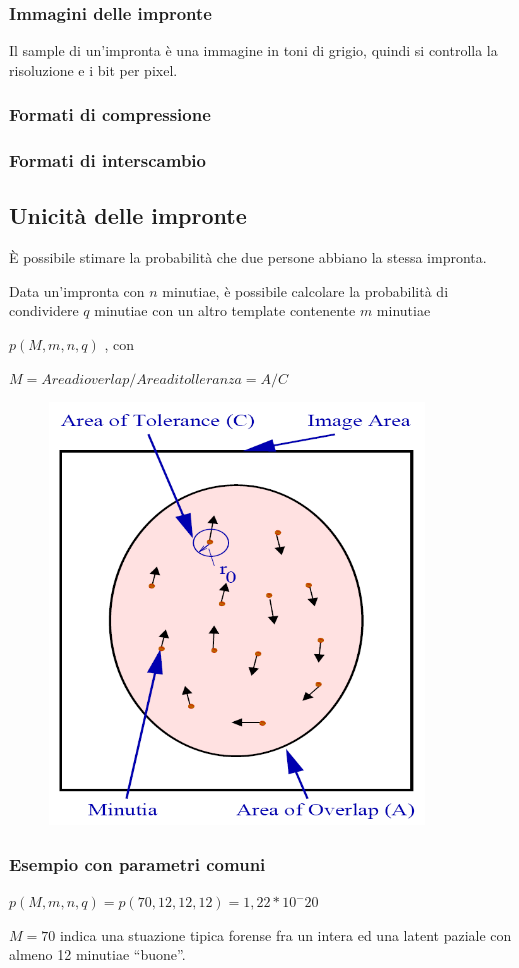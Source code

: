 \subsubsection{Immagini delle impronte}

Il sample di un'impronta è una immagine in toni di grigio, quindi si
controlla la risoluzione e i bit per pixel.

\subsubsection{Formati di compressione}

\subsubsection{Formati di interscambio}


\subsection{Unicità delle impronte}

È possibile stimare la probabilità che due persone abbiano la stessa impronta.

\noindent Data un'impronta con $n$ minutiae, è possibile calcolare la probabilità di
condividere $q$ minutiae con un altro template contenente $m$ minutiae

$p(M, m, n, q)$ , con

$M= Area di overlap / Area di tolleranza = A/C$

\begin{figure}[ht]
    \centering
    \includegraphics[width=0.5\linewidth]{chapters/images-chap5/unicita.png}
\end{figure}

\subsubsection{Esempio con parametri comuni}

$p(M,m,n,q) = p(70, 12, 12, 12) = 1,22 * 10^-20$

\noindent $M=70$ indica una stuazione tipica forense fra un intera ed una latent
paziale con almeno 12 minutiae “buone”.






